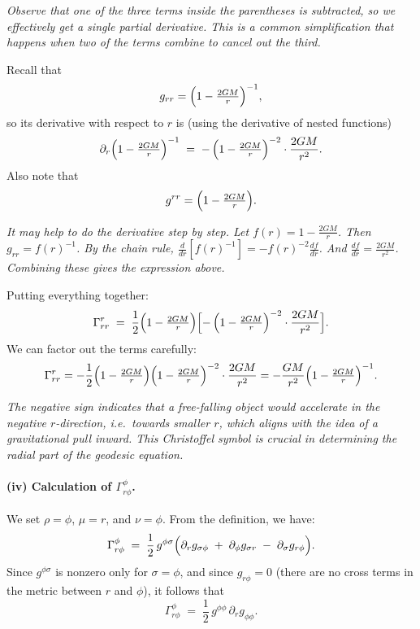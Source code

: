 \emph{Observe that one of the three terms inside the parentheses is subtracted, so we effectively get a single partial derivative. This is a common simplification that happens when two of the terms combine to cancel out the third.}

\smallskip

\noindent
Recall that
\[
g_{rr} 
= 
\Bigl(1 - \tfrac{2GM}{r}\Bigr)^{-1},
\]
so its derivative with respect to \(r\) is (using the derivative of nested functions)
\[
\partial_r \Bigl(1 - \tfrac{2GM}{r}\Bigr)^{-1}
\;=\;
-\,\Bigl(1 - \tfrac{2GM}{r}\Bigr)^{-2}
\cdot
\frac{2GM}{r^2}.
\]
Also note that
\[
g^{rr} 
= 
\Bigl(1 - \tfrac{2GM}{r}\Bigr).
\]

\emph{It may help to do the derivative step by step. Let \(f(r) = 1 - \tfrac{2GM}{r}\). Then \(g_{rr} = f(r)^{-1}\). By the chain rule, \(\tfrac{d}{dr}[f(r)^{-1}] = -f(r)^{-2} \tfrac{df}{dr}\). And \(\tfrac{df}{dr} = \tfrac{2GM}{r^2}\). Combining these gives the expression above.}

\smallskip

\noindent
Putting everything together:
\[
\Gamma^r_{rr}
\;=\;
\frac{1}{2}
\Bigl(1 - \tfrac{2GM}{r}\Bigr)
\Bigl[
-\,\Bigl(1 - \tfrac{2GM}{r}\Bigr)^{-2}
\cdot 
\frac{2GM}{r^2}
\Bigr].
\]
We can factor out the terms carefully:
\[
\Gamma^r_{rr}
=
-\frac{1}{2} 
\Bigl(1 - \tfrac{2GM}{r}\Bigr) 
\Bigl(1 - \tfrac{2GM}{r}\Bigr)^{-2}
\cdot
\frac{2GM}{r^2}
=
-\frac{GM}{r^2} 
\Bigl(1 - \tfrac{2GM}{r}\Bigr)^{-1}.
\]

\emph{The negative sign indicates that a free-falling object would accelerate in the negative \(r\)-direction, i.e.\ towards smaller \(r\), which aligns with the idea of a gravitational pull inward. This Christoffel symbol is crucial in determining the radial part of the geodesic equation.}

\paragraph{(iv) Calculation of \(\Gamma^\phi_{r\phi}\).}
We set \(\rho = \phi\), \(\mu = r\), and \(\nu = \phi\). From the definition, we have:
\[
\Gamma^\phi_{r\phi}
\;=\;
\frac{1}{2}\,g^{\phi\sigma}
\Bigl(
\partial_r g_{\sigma \phi}
\;+\;
\partial_\phi g_{\sigma r}
\;-\;
\partial_\sigma g_{r \phi}
\Bigr).
\]
Since \(g^{\phi\sigma}\) is nonzero only for \(\sigma = \phi\), and since \(g_{r\phi} = 0\) (there are no cross terms in the metric between \(r\) and \(\phi\)), it follows that
\[
\Gamma^\phi_{r\phi}
\;=\;
\frac{1}{2} \, g^{\phi\phi}\,\partial_r g_{\phi\phi}.
\]

